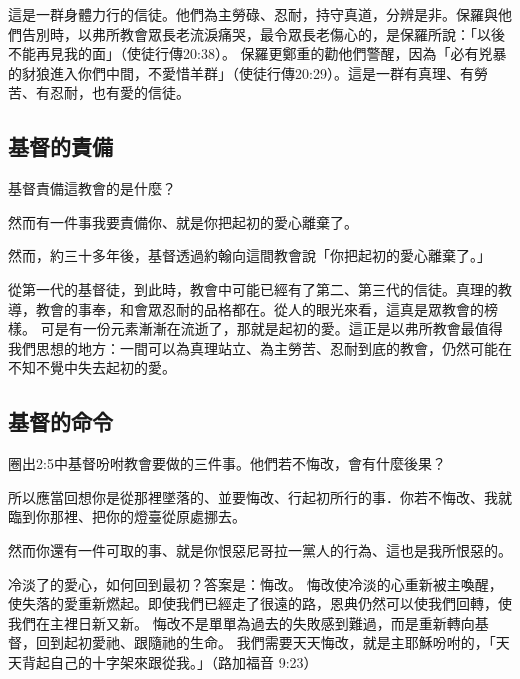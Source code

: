 這是一群身體力行的信徒。他們為主勞碌、忍耐，持守真道，分辨是非。保羅與他們告別時，以弗所教會眾長老流淚痛哭，最令眾長老傷心的，是保羅所說：「以後不能再見我的面」（使徒行傳20:38）。
保羅更鄭重的勸他們警醒，因為「必有兇暴的豺狼進入你們中間，不愛惜羊群」（使徒行傳20:29）。這是一群有真理、有勞苦、有忍耐，也有愛的信徒。

\subsection{基督的責備}

\begin{ScriptureBox2}{基督責備這教會的是什麼？}

\item[2:4] 然而有一件事我要責備你、就是你把起初的愛心離棄了。

\end{ScriptureBox2}

然而，約三十多年後，基督透過約翰向這間教會說「你把起初的愛心離棄了。」

從第一代的基督徒，到此時，教會中可能已經有了第二、第三代的信徒。真理的教導，教會的事奉，和會眾忍耐的品格都在。從人的眼光來看，這真是眾教會的榜樣。
可是有一份元素漸漸在流逝了，那就是起初的愛。這正是以弗所教會最值得我們思想的地方：一間可以為真理站立、為主勞苦、忍耐到底的教會，仍然可能在不知不覺中失去起初的愛。

\subsection{基督的命令}

\begin{ScriptureBox2}{圈出2:5中基督吩咐教會要做的三件事。他們若不悔改，會有什麼後果？}

\item[2:5] 所以應當回想你是從那裡墜落的、並要悔改、行起初所行的事．你若不悔改、我就臨到你那裡、把你的燈臺從原處挪去。

\item[2:6] 然而你還有一件可取的事、就是你恨惡尼哥拉一黨人的行為、這也是我所恨惡的。

\end{ScriptureBox2}

冷淡了的愛心，如何回到最初？答案是：悔改。
悔改使冷淡的心重新被主喚醒，使失落的愛重新燃起。即使我們已經走了很遠的路，恩典仍然可以使我們回轉，使我們在主裡日新又新。
悔改不是單單為過去的失敗感到難過，而是重新轉向基督，回到起初愛祂、跟隨祂的生命。
我們需要天天悔改，就是主耶穌吩咐的，「天天背起自己的十字架來跟從我。」（路加福音 9:23）


